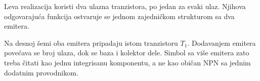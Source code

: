 Leva realizacija koristi dva ulazna tranzistora, po jedan za svaki ulaz. Njihova odgovarajuća funkcija ostvaruje se jednom zajedničkom strukturom sa dva emitera.

Na desnoj šemi oba emitera pripadaju istom tranzistoru $T_1$. Dodavanjem emitera povećava se broj ulaza, dok se baza i kolektor dele. Simbol sa više emitera zato treba čitati kao jednu integrisanu komponentu, a ne kao običan NPN sa jednim dodatnim provodnikom.

